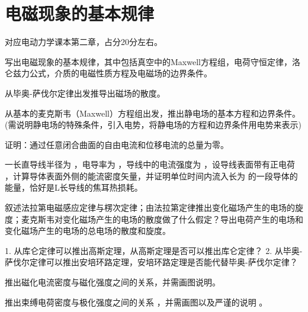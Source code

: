 \section{电磁现象的基本规律}
对应电动力学课本第二章，占分20分左右。

\begin{question}
写出电磁现象的基本规律，其中包括真空中的Maxwell方程组，电荷守恒定律，洛仑兹力公式，介质的电磁性质方程及电磁场的边界条件。
\end{question}

\begin{question} 
从毕奥-萨伐尔定律出发推导出磁场的散度。
\end{question}

\begin{question} 从基本的麦克斯韦（Maxwell）方程组出发，推出静电场的基本方程和边界条件。
(需说明静电场的特殊条件，引入电势，将静电场的方程和边界条件用电势来表示)
\end{question}

\begin{question} 证明：通过任意闭合曲面的自由电流和位移电流的总量为零。
\end{question}

\begin{question} 一长直导线半径为 ，电导率为 ，导线中的电流强度为 ，设导线表面带有正电荷 ，计算导体表面外侧的能流密度矢量，并证明单位时间内流入长为 的一段导体的能量，恰好是L长导线的焦耳热损耗。
\end{question}

\begin{question} 叙述法拉第电磁感应定律与楞次定律；由法拉第定律推出变化磁场产生的电场的旋度；麦克斯韦对变化磁场产生的电场的散度做了什么假定？导出电荷产生的电场和变化磁场产生的电场的总电场的散度和旋度。
\end{question}

\begin{question} 1. 从库仑定律可以推出高斯定理，从高斯定理是否可以推出库仑定律？
2. 从毕奥-萨伐尔定律可以推出安培环路定理，安培环路定理是否能代替毕奥-萨伐尔定律？
\end{question}

\begin{question} 推出磁化电流密度与磁化强度之间的关系，并需画图说明。
\end{question}

\begin{question} 推出束缚电荷密度与极化强度之间的关系 ，并需画图以及严谨的说明 。
\end{question}

